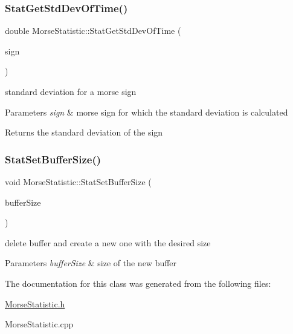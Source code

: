 \subsubsection{\texorpdfstring{Stat\+Get\+Std\+Dev\+Of\+Time()}{StatGetStdDevOfTime()}}
{\footnotesize\ttfamily double Morse\+Statistic\+::\+Stat\+Get\+Std\+Dev\+Of\+Time (\begin{DoxyParamCaption}\item[{Morse\+::\+Morse\+Sign}]{sign }\end{DoxyParamCaption})}



standard deviation for a morse sign 


\begin{DoxyParams}{Parameters}
{\em sign} & morse sign for which the standard deviation is calculated \\
\hline
\end{DoxyParams}
\begin{DoxyReturn}{Returns}
the standard deviation of the sign 
\end{DoxyReturn}
\mbox{\label{classMorseStatistic_ae5f4ab08849cd2cb724748108309661e}} 
\subsubsection{\texorpdfstring{Stat\+Set\+Buffer\+Size()}{StatSetBufferSize()}}
{\footnotesize\ttfamily void Morse\+Statistic\+::\+Stat\+Set\+Buffer\+Size (\begin{DoxyParamCaption}\item[{int}]{buffer\+Size }\end{DoxyParamCaption})}



delete buffer and create a new one with the desired size 


\begin{DoxyParams}{Parameters}
{\em buffer\+Size} & size of the new buffer \\
\hline
\end{DoxyParams}


The documentation for this class was generated from the following files\+:\begin{DoxyCompactItemize}
\item 
\hyperlink{MorseStatistic_8h}{Morse\+Statistic.\+h}\item 
Morse\+Statistic.\+cpp\end{DoxyCompactItemize}
